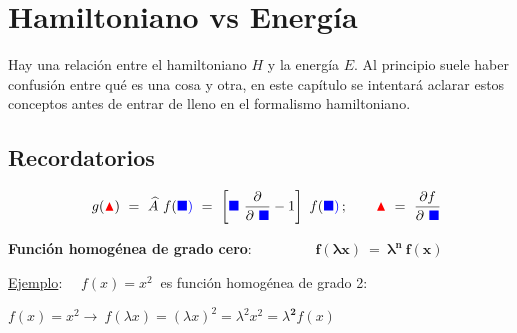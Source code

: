\chapter{Hamiltoniano vs Energía}


\vspace{1cm}

\begin{adjustwidth}{50pt}{50pt}
\begin{ejemplo}
	Hay una relación entre el hamiltoniano $H$ y la energía $E$. Al principio suele haber confusión entre qué es una cosa y otra, en este capítulo se intentará aclarar estos conceptos antes de entrar de lleno en el formalismo hamiltoniano.
\end{ejemplo}
\end{adjustwidth}
	
\vspace{1cm}

\section{Recordatorios}

\begin{large}
\begin{myalertblock}
$$\quad g(\textcolor{red}{\blacktriangle}) \ = \ \widehat A  \ f (\textcolor{blue}{\blacksquare)} \ = \ \left[ \textcolor{blue}{\blacksquare} \ \pdv{\ \textcolor{blue}{\blacksquare}} - 1 \right] \ f (\textcolor{blue}{\blacksquare)} \, ; \qquad \textcolor{red}{\blacktriangle} \ = \ \pdv{f}{\ \textcolor{blue}{\blacksquare}}	$$
\end{myalertblock}
\end{large}
\vspace{5mm}

\begin{definition}

\textbf{Función homogénea de grado cero}: $\qquad \qquad \boldsymbol {\boxed{ \ f(\lambda x) \ = \ \lambda^n\ f(x) \ } }$	
\end{definition}

\underline{Ejemplo}: $\quad f(x)=x^2 \ $ es función homogénea de grado 2:

$f(x)=x^2 \to \ f(\lambda x)=(\lambda x)^2=\lambda^2 x^2 = \lambda^{\boldsymbol{2}} f(x)$

